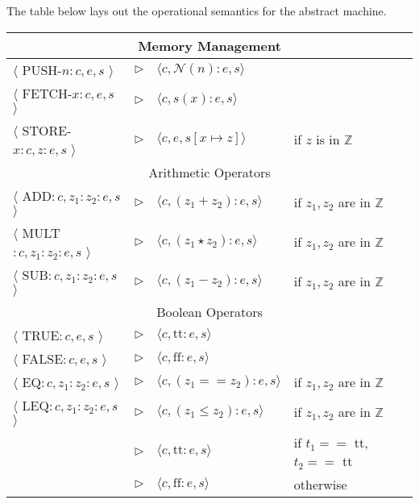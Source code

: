 \documentclass[a4paper, 12pt, twoside]{article}
\begin{document}
The table below lays out the operational semantics for the abstract machine.
\begin{center}
  \renewcommand{\arraystretch}{1.6}
  \begin{tabular}{ l c l l }
    \hline \multicolumn{4}{c}{Memory Management} \\ \hline
    $\langle$ PUSH-$n:c, e, s$             $\rangle$ & $\triangleright$ & $\langle c, \mathcal{N}(n):e, s \rangle$ & \\
    $\langle$ FETCH-$x:c, e, s$            $\rangle$ & $\triangleright$ & $\langle c, s(x):e, s \rangle$ & \\
    $\langle$ STORE-$x:c, z:e, s$          $\rangle$ & $\triangleright$ & $\langle c, e, s[x \mapsto z] \rangle$ & if $z$ is in $\mathbb{Z}$ \\
    \hline \multicolumn{4}{c}{Arithmetic Operators} \\ \hline
    $\langle$ ADD$:c, z_1:z_2:e, s$        $\rangle$ & $\triangleright$ & $\langle c, (z_1 + z_2):e, s \rangle$ & if $z_1, z_2$ are in $\mathbb{Z}$ \\
    $\langle$ MULT$:c, z_1:z_2:e, s$       $\rangle$ & $\triangleright$ & $\langle c, (z_1 \star z_2):e, s \rangle$ & if $z_1, z_2$ are in $\mathbb{Z}$ \\
    $\langle$ SUB$:c, z_1:z_2:e, s$        $\rangle$ & $\triangleright$ & $\langle c, (z_1 - z_2):e, s \rangle$ & if $z_1, z_2$ are in $\mathbb{Z}$ \\
    \hline \multicolumn{4}{c}{Boolean Operators} \\ \hline
    $\langle$ TRUE$:c, e, s$               $\rangle$ & $\triangleright$ & $\langle c, \text{tt}:e, s \rangle$ & \\
    $\langle$ FALSE$:c, e, s$              $\rangle$ & $\triangleright$ & $\langle c, \text{ff}:e, s \rangle$ & \\
    $\langle$ EQ$:c, z_1:z_2:e, s$         $\rangle$ & $\triangleright$ & $\langle c, (z_1 == z_2):e, s \rangle$ & if $z_1, z_2$ are in $\mathbb{Z}$ \\
    $\langle$ LEQ$:c, z_1:z_2:e, s$        $\rangle$ & $\triangleright$ & $\langle c, (z_1 \leq z_2):e, s \rangle$ & if $z_1, z_2$ are in $\mathbb{Z}$ \\
   
    \hdashline

    \multirow{2}{*}{
    $\langle$ AND$:c, t_1:t_2:e, s$ $\rangle$
    } & $\triangleright$ & $\langle c, \text{tt}:e, s \rangle$ & if $t_1 == $ tt, $t_2 == $ tt \\
    & $\triangleright$ & $\langle c, \text{ff}:e, s \rangle$ & otherwise \\
    

\end{tabular}
\end{center}
\end{document}
